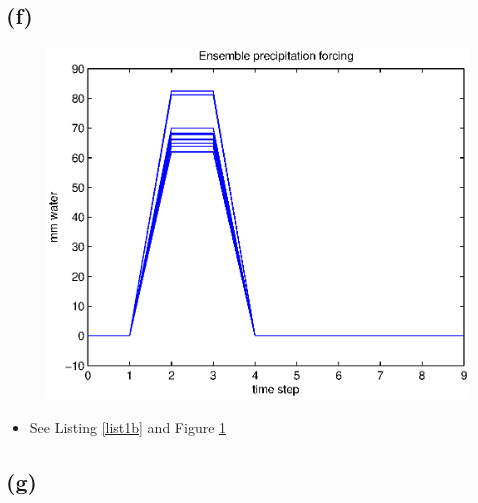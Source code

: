 \documentclass[letterpaper]{tufte-handout}
\begin{document}
  \subsection{(f)}
  \begin{figure}
    \includegraphics[width=\textwidth]{1f}
    \label{1f}
  \end{figure}
  \begin{itemize}
    \item See Listing \ref{list1b} and Figure \ref{1f}
  \end{itemize}
  \subsection{(g)}
\end{document}
